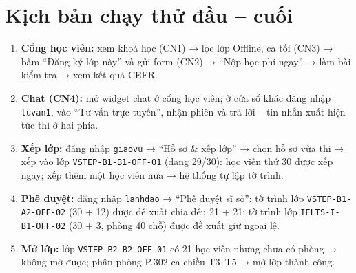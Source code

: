 \section{Kịch bản chạy thử đầu – cuối}
\begin{enumerate}
  \item \textbf{Cổng học viên:} xem khoá học (CN1) → lọc lớp Offline, ca tối (CN3) → bấm “Đăng ký lớp này” và gửi form (CN2) → “Nộp học phí ngay” → làm bài kiểm tra → xem kết quả CEFR.
  \item \textbf{Chat (CN4):} mở widget chat ở cổng học viên; ở cửa sổ khác đăng nhập \texttt{tuvan1}, vào “Tư vấn trực tuyến”, nhận phiên và trả lời – tin nhắn xuất hiện tức thì ở hai phía.
  \item \textbf{Xếp lớp:} đăng nhập \texttt{giaovu} → “Hồ sơ \& xếp lớp” → chọn hồ sơ vừa thi → xếp vào lớp \texttt{VSTEP-B1-B1-OFF-01} (đang 29/30): học viên thứ 30 được xếp ngay; xếp thêm một học viên nữa → hệ thống tự lập tờ trình.
  \item \textbf{Phê duyệt:} đăng nhập \texttt{lanhdao} → “Phê duyệt sĩ số”: tờ trình lớp \texttt{VSTEP-B1-A2-OFF-02} (30 + 12) được đề xuất chia đều 21 + 21; tờ trình lớp \texttt{IELTS-I-B1-OFF-02} (30 + 3, phòng 40 chỗ) được đề xuất giữ ngoại lệ.
  \item \textbf{Mở lớp:} lớp \texttt{VSTEP-B2-B2-OFF-01} có 21 học viên nhưng chưa có phòng → không mở được; phân phòng P.302 ca chiều T3–T5 → mở lớp thành công.
\end{enumerate}

